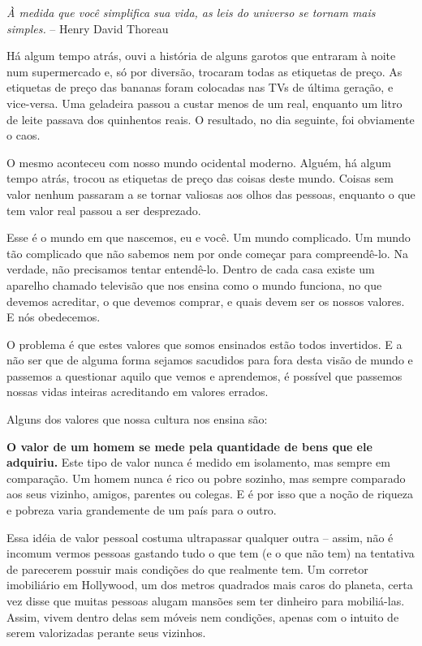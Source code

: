 \begin{center}
  {\small{\em À medida que você simplifica sua vida, as leis do universo se tornam mais simples.} -- Henry David Thoreau}
\end{center}

Há algum tempo atrás, ouvi a história de alguns garotos que entraram à noite num supermercado e, só por diversão, trocaram todas as etiquetas de preço. As etiquetas de preço das bananas foram colocadas nas TVs de última geração, e vice-versa. Uma geladeira passou a custar menos de um real, enquanto um litro de leite passava dos quinhentos reais. O resultado, no dia seguinte, foi obviamente o caos.

O mesmo aconteceu com nosso mundo ocidental moderno. Alguém, há algum tempo atrás, trocou as etiquetas de preço das coisas deste mundo. Coisas sem valor nenhum passaram a se tornar valiosas aos olhos das pessoas, enquanto o que tem valor real passou a ser desprezado.

Esse é o mundo em que nascemos, eu e você. Um mundo complicado. Um mundo tão complicado que não sabemos nem por onde começar para compreendê-lo. Na verdade, não precisamos tentar entendê-lo. Dentro de cada casa existe um aparelho chamado televisão que nos ensina como o mundo funciona, no que devemos acreditar, o que devemos comprar, e quais devem ser os nossos valores. E nós obedecemos.

O problema é que estes valores que somos ensinados estão todos invertidos. E a não ser que de alguma forma sejamos sacudidos para fora desta visão de mundo e passemos a questionar aquilo que vemos e aprendemos, é possível que passemos nossas vidas inteiras acreditando em valores errados.

Alguns dos valores que nossa cultura nos ensina são:

\textbf{O valor de um homem se mede pela quantidade de bens que ele adquiriu.} Este tipo de valor nunca é medido em isolamento, mas sempre em comparação. Um homem nunca é rico ou pobre sozinho, mas sempre comparado aos seus vizinho, amigos, parentes ou colegas. E é por isso que a noção de riqueza e pobreza varia grandemente de um país para o outro.

Essa idéia de valor pessoal costuma ultrapassar qualquer outra -- assim, não é incomum vermos pessoas gastando tudo o que tem (e o que não tem) na tentativa de parecerem possuir mais condições do que realmente tem. Um corretor imobiliário em Hollywood, um dos metros quadrados mais caros do planeta, certa vez disse que muitas pessoas alugam mansões sem ter dinheiro para mobiliá-las. Assim, vivem dentro delas sem móveis nem condições, apenas com o intuito de serem valorizadas perante seus vizinhos.

